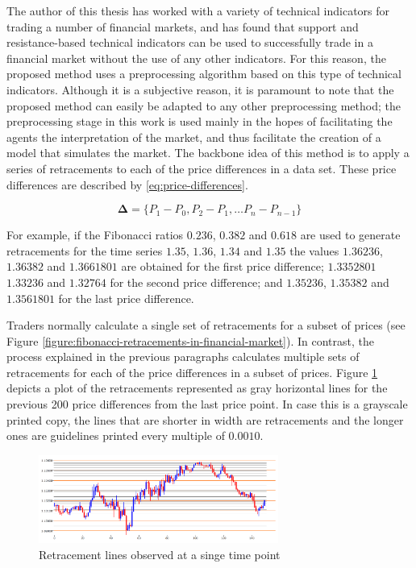 The author of this thesis has worked with a variety of technical indicators for
trading a number of financial markets, and has found that support and
resistance-based technical indicators can be used to successfully trade in a
financial market without the use of any other indicators. For this reason, the
proposed method uses a preprocessing algorithm based on this type of technical
indicators. Although it is a subjective reason, it is paramount to note that the
proposed method can easily be adapted to any other preprocessing method; the
preprocessing stage in this work is used mainly in the hopes of facilitating the
agents the interpretation of the market, and thus facilitate the creation of a
model that simulates the market. The backbone idea of this method is to apply a
series of retracements to each of the price differences in a data set. These
price differences are described by \ref{eq:price-differences}.

\begin{equation}
  \label{eq:price-differences}
  \bm{\Delta} = \{ P_1 - P_0, P_2 - P_1, \ldots P_n - P_{n-1} \}
\end{equation}

For example, if the Fibonacci ratios $0.236$, $0.382$ and $0.618$ are used to
generate retracements for the time series $1.35$, $1.36$, $1.34$ and $1.35$ the
values $1.36236$, $1.36382$ and $1.3661801$ are obtained for the first price
difference; $1.3352801$ $1.33236$ and $1.32764$ for the second price difference;
and $1.35236$, $1.35382$ and $1.3561801$ for the last price difference.

Traders normally calculate a single set of retracements for a subset of prices
(see Figure \ref{figure:fibonacci-retracements-in-financial-market}). In
contrast, the process explained in the previous paragraphs calculates multiple
sets of retracements for each of the price differences in a subset of
prices. Figure \ref{figure:retracements-one-price} depicts a plot of the
retracements represented as gray horizontal lines for the previous 200 price
differences from the last price point. In case this is a grayscale printed copy,
the lines that are shorter in width are retracements and the longer ones are
guidelines printed every multiple of $0.0010$.

\begin{figure}
\centering
\includegraphics[width=0.7\textwidth]{img/retracements-preprocessing-one-price.png}
\caption{Retracement lines observed at a singe time point}
\label{figure:retracements-one-price}
\end{figure}

